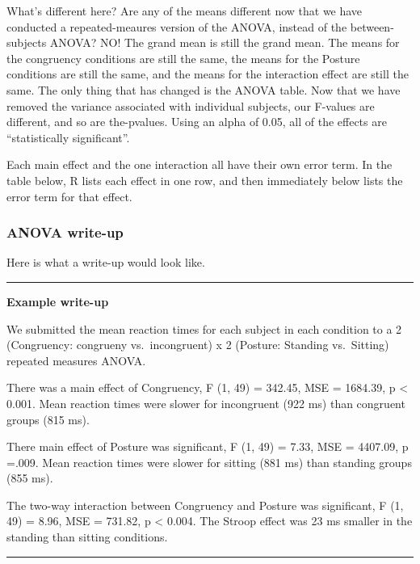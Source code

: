\documentclass[
]{book}
\begin{document}
What's different here? Are any of the means different now that we have conducted a repeated-meaures version of the ANOVA, instead of the between-subjects ANOVA? NO! The grand mean is still the grand mean. The means for the congruency conditions are still the same, the means for the Posture conditions are still the same, and the means for the interaction effect are still the same. The only thing that has changed is the ANOVA table. Now that we have removed the variance associated with individual subjects, our F-values are different, and so are the-pvalues. Using an alpha of 0.05, all of the effects are ``statistically significant''.

Each main effect and the one interaction all have their own error term. In the table below, R lists each effect in one row, and then immediately below lists the error term for that effect.

\hypertarget{anova-write-up-1}{%
\subsubsection{ANOVA write-up}\label{anova-write-up-1}}

Here is what a write-up would look like.

\begin{center}\rule{0.5\linewidth}{0.5pt}\end{center}

\textbf{Example write-up}

We submitted the mean reaction times for each subject in each condition to a 2 (Congruency: congrueny vs.~incongruent) x 2 (Posture: Standing vs.~Sitting) repeated measures ANOVA.

There was a main effect of Congruency, F (1, 49) = 342.45, MSE = 1684.39, p \textless{} 0.001. Mean reaction times were slower for incongruent (922 ms) than congruent groups (815 ms).

There main effect of Posture was significant, F (1, 49) = 7.33, MSE = 4407.09, p =.009. Mean reaction times were slower for sitting (881 ms) than standing groups (855 ms).

The two-way interaction between Congruency and Posture was significant, F (1, 49) = 8.96, MSE = 731.82, p \textless{} 0.004. The Stroop effect was 23 ms smaller in the standing than sitting conditions.

\begin{center}\rule{0.5\linewidth}{0.5pt}\end{center}
\end{document}

